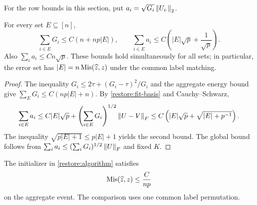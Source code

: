 For the row bounds in this section, put
$a_i=\sqrt{G_i}\left\lVert U_{i\cdot}\right\rVert_2$.

\begin{lemma}
\label{restore:fit-wrong-mass}
For every set $E\subseteq[n]$,
\begin{equation}\label{restore:fit-wrong-mass-bounds}
 \sum_{i\in E}G_i\le C(n+np|E|),\qquad
 \sum_{i\in E}a_i\le C\left(|E|\sqrt p+\frac1{\sqrt p}\right).
\end{equation}
Also $\sum_i a_i\le Cn\sqrt p$. These bounds hold simultaneously
for all sets; in particular, the error set has
$|E|=n\operatorname{Mis}(\widehat z,z)$ under the common label matching.
\end{lemma}

\begin{proof}
The inequality $G_i\le2\tau+(G_i-\tau)^2/G_i$ and the aggregate
energy bound give $\sum_EG_i\le C(np|E|+n)$. By
\eqref{restore:fit-basis} and Cauchy--Schwarz,
\[
 \sum_{i\in E}a_i
 \le C|E|\sqrt p+
      \left(\sum_{i\in E}G_i\right)^{1/2}\left\lVert U-V\right\rVert_F
 \le C\left(|E|\sqrt p+\sqrt{|E|+p^{-1}}\right).
\]
The inequality $\sqrt{p|E|+1}\le p|E|+1$ yields the second bound.
The global bound follows from
$\sum_i a_i\le(\sum_iG_i)^{1/2}\left\lVert U\right\rVert_F$ and fixed $K$.
\end{proof}

\begin{lemma}
\label{restore:fit-initializer}
The initializer in \cref{restore:algorithm} satisfies
\[
 \operatorname{Mis}(\widehat z,z)\le \frac{C}{np}
\]
on the aggregate event. The comparison uses one common label permutation.
\end{lemma}

